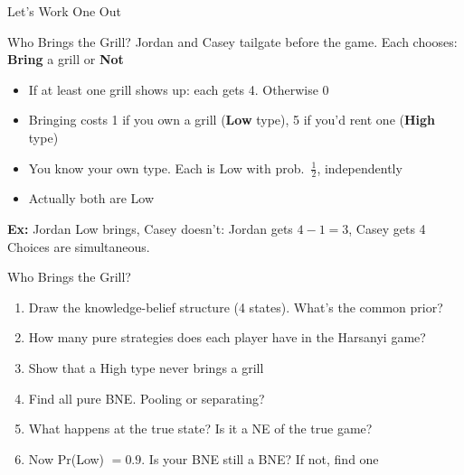 
\begin{frame}[standout]
Let's Work One Out
\end{frame}

\begin{frame}{Who Brings the Grill?}
Jordan and Casey tailgate before the game. Each chooses: \textbf{Bring} a grill or \textbf{Not}
\begin{itemize}
    \item If at least one grill shows up: each gets 4. Otherwise 0
    \item Bringing costs 1 if you own a grill (\textbf{Low} type), 5 if you'd rent one (\textbf{High} type)
    \item You know your own type. Each is Low with prob.\ $\tfrac12$, independently
    \item Actually both are Low
\end{itemize}
\bsk
\textbf{Ex:} Jordan Low brings, Casey doesn't: Jordan gets $4-1=3$, Casey gets 4
\vfill
{\footnotesize Choices are simultaneous.}
\vspace{-0.2in}
\end{frame}

\begin{frame}{Who Brings the Grill?}
\begin{enumerate}
    \item Draw the knowledge-belief structure (4 states). What's the common prior? \vspace{0.3in}
    \item How many pure strategies does each player have in the Harsanyi game? \vspace{0.2in}
    \item Show that a High type never brings a grill \vspace{0.2in}
    \item Find all pure BNE. Pooling or separating? \vspace{0.3in}
    \item What happens at the true state? Is it a NE of the true game? \vspace{0.3in}
    \item Now Pr(Low) $=0.9$. Is your BNE still a BNE? If not, find one \vspace{0.1in}
\end{enumerate}
\vspace{-0.3in}
\end{frame}

